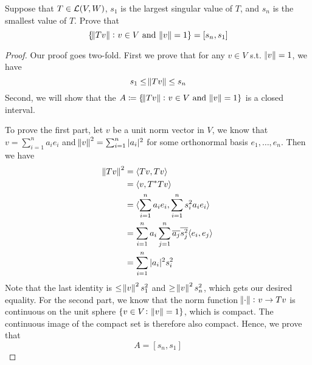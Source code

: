 \documentclass{extarticle}
\begin{document}
\begin{problem}{4}
    Suppose that \(T \in \mathcal{L}(V, W)\), \(s_1\) is the largest singular value of \(T\), and 
    \(s_n\) is the smallest value of \(T\). Prove that 
    \[\{\norm{Tv} \colon v \in V \text{ and } \norm{v} = 1\} = [s_n, s_1]\]
\end{problem}

\begin{proof}
Our proof goes two-fold. First we prove that for any \(v \in V\) s.t. \(\norm{v} = 1\), we have 
\[s_1 \leq \norm{Tv} \leq s_n\]
Second, we will show that the \(A \coloneqq \{\norm{Tv} \colon v \in V \text{ and } \norm{v} = 1\} \) 
is a closed interval. 

To prove the first part, let \(v\) be a unit norm vector in \(V\), we know that 
\(v = \sum_{i=1}^{n}a_i e_i\) and \(\norm{v}^2 = \sum_{i=1}^{n} |a_i|^2\) for some orthonormal 
basis \(e_1, \ldots, e_n\). Then we have 
\begin{align*}
    \norm{Tv}^2 
    &= \langle Tv,Tv \rangle \\ 
    &= \langle v,T^*Tv \rangle \\ 
    &= \langle \sum_{i=1}^{n} a_i e_i, \sum_{i=1}^{n} s_i^2a_ie_i \rangle \\ 
    &= \sum_{i=1}^{n} a_i \sum_{j=1}^{n} \overline{a_j} \overline{s_j^2} \langle e_i,e_j \rangle \\ 
    &= \sum_{i=1}^{n} |a_i|^2 s_i^2 \\ 
\end{align*}
Note that the last identity is \(\leq \norm{v}^2 s_1^2\) and \(\geq \norm{v}^2 s_n^2\), which gets 
our desired equality. For the second part, we know that the norm function \(\norm{\cdot} \colon 
v \to Tv\) is continuous on the unit sphere \(\{v \in V \colon \norm{v}  =1\}\), which is compact. The 
continuous image of the compact set is therefore also compact. Hence, we prove that 
\[A = [s_n, s_1]\]
\end{proof}
\end{document}
